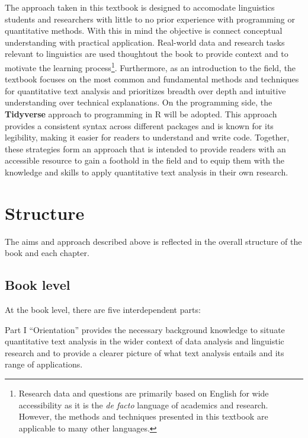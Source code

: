 \documentclass[
  letterpaper,
  DIV=11,
  numbers=noendperiod]{scrreprt}
\theoremstyle{definition}
\theoremstyle{remark}
\begin{document}

The approach taken in this textbook is designed to accomodate
linguistics students and researchers with little to no prior experience
with programming or quantitative methods. With this in mind the
objective is connect conceptual understanding with practical
application. Real-world data and research tasks relevant to linguistics
are used thoughtout the book to provide context and to motivate the
learning process\footnote{Research data and questions are primarily
  based on English for wide accessibility as it is the \emph{de facto}
  language of academics and research. However, the methods and
  techniques presented in this textbook are applicable to many other
  languages.}. Furthermore, as an introduction to the field, the
textbook focuses on the most common and fundamental methods and
techniques for quantitative text analysis and prioritizes breadth over
depth and intuitive understanding over technical explanations. On the
programming side, the
\textbf{Tidyverse} approach to
programming in R will be adopted. This approach provides a consistent
syntax across different packages and is known for its legibility, making
it easier for readers to understand and write code. Together, these
strategies form an approach that is intended to provide readers with an
accessible resource to gain a foothold in the field and to equip them
with the knowledge and skills to apply quantitative text analysis in
their own research.

\section*{Structure}\label{sec-p-structure}


The aims and approach described above is reflected in the overall
structure of the book and each chapter.

\subsection*{Book level}\label{sec-p-structure-book}

At the book level, there are five interdependent parts:

Part I ``Orientation'' provides the necessary background knowledge to
situate quantitative text analysis in the wider context of data analysis
and linguistic research and to provide a clearer picture of what text
analysis entails and its range of applications.
\end{document}
